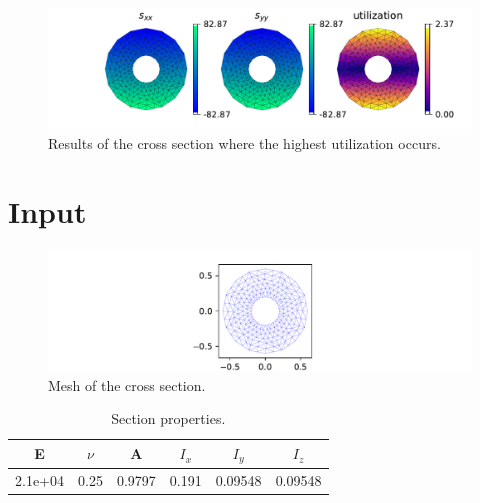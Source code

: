 \documentclass{article}%
\begin{document}
%


\begin{figure}[h!]%
\centering%
\includegraphics[width=\textwidth]{cross section results.pdf}%
\caption{Results of the cross section where the highest utilization occurs.}%
\end{figure}

%
\newpage

%
\section{Input}%
\label{sec:Input}%


\begin{figure}[h!]%
\centering%
\includegraphics[width=\textwidth]{cross section.pdf}%
\caption{Mesh of the cross section.}%
\end{figure}

%
\begin{table}[h!]\centering%
\begin{tabular}{| c c | c c c c |}%
\hline%
E&$\nu$&A&$I_x$&$I_y$&$I_z$\\%
\hline%
\hline%
2.1e+04&0.25&0.9797&0.191&0.09548&0.09548\\%
\hline%
\end{tabular}%
\caption{Section properties.}\label{table:tbl-section}\end{table}

%
\end{document}
